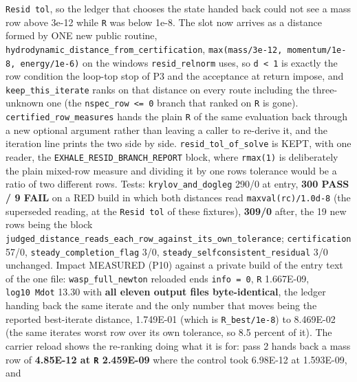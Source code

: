 \documentclass[english,a4paper]{my_memo}
\begin{document}
\begin{itemize}
  \texttt{Resid\ tol}, so the ledger that chooses the state handed back could not see
  a mass row above 3e-12 while \texttt{\textbar{}\textbar{}R\textbar{}\textbar{}} was below 1e-8. The slot now arrives as
  a distance formed by ONE new public routine,
  \texttt{hydrodynamic\_distance\_from\_certification}, \texttt{max(mass/3e-12,\ momentum/1e-8,\ energy/1e-6)} on the windows \texttt{resid\_relnorm} uses, so \texttt{d\ \textless{}\ 1} is exactly the
  row condition the loop-top stop of P3 and the acceptance at return impose,
  and \texttt{keep\_this\_iterate} ranks on that distance on every route including the
  three-unknown one (the \texttt{nspec\_row\ \textless{}=\ 0} branch that ranked on \texttt{\textbar{}\textbar{}R\textbar{}\textbar{}} is
  gone). \texttt{certified\_row\_measures} hands the plain \texttt{\textbar{}\textbar{}R\textbar{}\textbar{}} of the same
  evaluation back through a new optional argument rather than leaving a caller
  to re-derive it, and the iteration line prints the two side by side.
  \texttt{resid\_tol\_of\_solve} is KEPT, with one reader, the
  \texttt{EXHALE\_RESID\_BRANCH\_REPORT} block, where \texttt{rmax(1)} is deliberately the
  plain mixed-row measure and dividing it by one row\textquotesingle s tolerance would be a
  ratio of two different rows. Tests: \texttt{krylov\_and\_dogleg} 290/0 at entry,
  \textbf{300 PASS / 9 FAIL} on a RED build in which both distances read
  \texttt{maxval(rc)/1.0d-8} (the superseded reading, at the \texttt{Resid\ tol} of these
  fixtures), \textbf{309/0} after, the 19 new rows being the block
  \texttt{judged\_distance\_reads\_each\_row\_against\_its\_own\_tolerance}; \texttt{certification}
  57/0, \texttt{steady\_completion\_flag} 3/0, \texttt{steady\_selfconsistent\_residual} 3/0
  unchanged. Impact MEASURED (P10) against a private build of the entry text
  of the one file: \texttt{wasp\_full\_newton} reloaded ends \texttt{info\ =\ 0}, \texttt{\textbar{}\textbar{}R\textbar{}\textbar{}}
  1.667E-09, \texttt{log10\ Mdot} 13.30 with \textbf{all eleven output files
  byte-identical}, the ledger handing back the same iterate and the only
  number that moves being the reported best-iterate distance, 1.749E-01
  (which is \texttt{\textbar{}\textbar{}R\textbar{}\textbar{}\_best/1e-8}) to 8.469E-02 (the same iterate\textquotesingle s worst row over
  its own tolerance, so 8.5 percent of it). The carrier reload shows the
  re-ranking doing what it is for: pass 2 hands back a mass row of \textbf{4.85E-12
  at \texttt{\textbar{}\textbar{}R\textbar{}\textbar{}} 2.459E-09} where the control took 6.98E-12 at 1.593E-09, and

\end{itemize}
\end{document}
